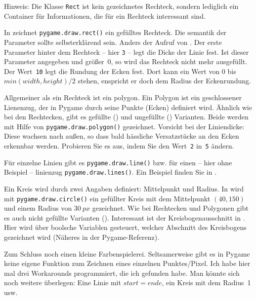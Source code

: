 Hinweis: Die Klasse \texttt{Rect} ist kein gezeichnetes Rechteck, sondern lediglich ein Container für Informationen, die für ein Rechteck interessant sind. 

In  zeichnet \texttt{pygame.draw.rect()} ein gefülltes Rechteck. Die \Gls{semantik} der Parameter sollte selbsterklärend sein. Anders der Aufruf von . Der erste Parameter hinter dem Rechteck -- hier \texttt{3} -- legt die Dicke der Linie fest. Ist dieser Parameter angegeben und größer~0, so wird das Rechteck nicht mehr ausgefüllt. Der Wert~\texttt{10} legt die Rundung der Ecken fest. Dort kann ein Wert von 0 bis $min(width, height)/2$ stehen, enspricht er doch dem Radius der Eckenrundung.

Allgemeiner als ein Rechteck ist ein \Gls{polygon}. Ein Polygon ist ein geschlossener Lienenzug, der in Pygame durch seine Punkte (Ecken) definiert wird. Ähnlich wie bei den Rechtecken, gibt es gefüllte () und ungefüllte () Varianten. Beide werden mit Hilfe von \texttt{pygame.draw.polygon()} gezeichnet. Vorsicht bei der Liniendicke: Diese wachsen nach außen, so dass bald hässliche Versatzstücke an den Ecken erkennbar werden. Probieren Sie es aus, indem Sie den Wert~\texttt{2} in~\texttt{5} ändern.

Für einzelne Linien gibt es \texttt{pygame.draw.line()} bzw. für einen -- hier ohne Beispiel -- \gls{linienzug} \texttt{pygame.draw.lines()}. Ein Beispiel finden Sie in .

Ein Kreis wird durch zwei Angaben definiert: Mittelpunkt und Radius. In  wird mit \texttt{pygame.draw.circle()} ein gefüllter Kreis mit dem Mittelpunkt $(40, 150)$ und einem Radius von $30~px$ gezeichnet. Wie bei Rechtecken und Polygonen gibt es auch nicht gefüllte Varianten (). Interessant ist der Kreisbogenausschnitt in . Hier wird über boolsche Variablen gesteuert, welcher Abschnitt des Kreisbogens gezeichnet wird (Näheres in der Pygame-Referenz).

Zum Schluss noch einen kleine Farbenspielerei. Seltsamerweise gibt es in Pygame keine eigene Funktion zum Zeichnen eines einzelnen Punktes/Pixel. Ich habe hier mal drei Workarounds programmiert, die ich gefunden habe. Man könnte sich noch weitere überlegen: Eine Linie mit $start=ende$, ein Kreis mit dem Radius~1 usw.

